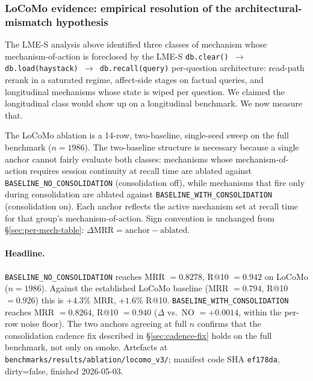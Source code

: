 \documentclass[11pt]{article}
\begin{document}
\subsubsection{LoCoMo evidence: empirical resolution of the architectural-mismatch hypothesis}
\label{sec:locomo-evidence}
\label{sec:locomo-forthcoming}

The LME-S analysis above identified three classes of mechanism whose
mechanism-of-action is foreclosed by the LME-S
\texttt{db.clear() $\to$ db.load(haystack) $\to$ db.recall(query)}
per-question architecture: read-path rerank in a saturated regime,
affect-side stages on factual queries, and longitudinal mechanisms
whose state is wiped per question.  We claimed the longitudinal class
would show up on a longitudinal benchmark.  We now measure that.

The LoCoMo ablation is a 14-row, two-baseline, single-seed sweep on
the full benchmark ($n = 1986$).  The two-baseline structure is
necessary because a single anchor cannot fairly evaluate both
classes: mechanisms whose mechanism-of-action requires session
continuity at recall time are ablated against
\texttt{BASELINE\_NO\_CONSOLIDATION} (consolidation off), while
mechanisms that fire only during consolidation are ablated against
\texttt{BASELINE\_WITH\_CONSOLIDATION} (consolidation on).  Each
anchor reflects the active mechanism set at recall time for that
group's mechanism-of-action.  Sign convention is unchanged from
\S\ref{sec:per-mech-table}: $\Delta\text{MRR} = \text{anchor} -
\text{ablated}$.

\paragraph{Headline.}  \texttt{BASELINE\_NO\_CONSOLIDATION} reaches
MRR $= 0.8278$, R@10 $= 0.942$ on LoCoMo ($n = 1986$).  Against the
established LoCoMo baseline (MRR $= 0.794$, R@10 $= 0.926$) this is
$+4.3\%$ MRR, $+1.6\%$ R@10.
\texttt{BASELINE\_WITH\_CONSOLIDATION} reaches MRR $= 0.8264$,
R@10 $= 0.940$ ($\Delta$ vs.\ NO $= +0.0014$, within the per-row
noise floor).  The two anchors agreeing at full $n$ confirms that the
consolidation cadence fix described in \S\ref{sec:cadence-fix} holds
on the full benchmark, not only on smoke.  Artefacts at
\texttt{benchmarks/results/ablation/locomo\_v3/}; manifest code SHA
\texttt{ef178da}, dirty=false, finished 2026-05-03.
\end{document}
